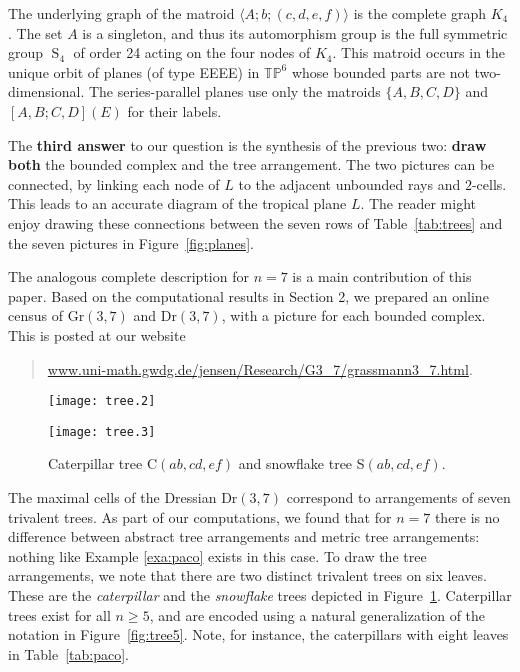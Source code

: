\documentclass[12pt,a4paper]{amsart}
\theoremstyle{definition}
\newcommand{\Gr}{{\mathrm{Gr}}}
\newcommand{\Dr}{{\mathrm{Dr}}}
\newcommand{\TP}{{\mathbb{TP}}}
\providecommand{\Sym}{\operatorname{S}}
\begin{document}
The underlying graph of the matroid $\langle A;b;(c,d,e,f)\rangle$ is
the complete graph $K_4$.  The set $A$ is a singleton, and thus its
automorphism group is the full symmetric group $\Sym_4$ of order 24
acting on the four nodes of $K_4$.  This matroid occurs in the unique
orbit of planes (of type EEEE) in $\TP^6$ whose bounded parts are not
two-dimensional. The series-parallel planes use only the matroids
$\{A,B,C,D\}$ and   $[A,B;C,D](E)$ for their labels.

The \textbf{third answer} to our question is the synthesis of the
previous two: \textbf{draw both} the bounded complex and the tree
arrangement.  The two pictures can be connected, by linking each node
of $L$ to the adjacent unbounded rays and $2$-cells. This leads to an
accurate diagram of the tropical plane $L$. The reader might enjoy
drawing these connections between the seven rows of
Table~\ref{tab:trees} and the seven pictures in
Figure~\ref{fig:planes}.

The analogous complete description for $n=7$ is a main contribution of
this paper. Based on the computational results in Section 2, we
prepared an online census of $\Gr(3,7)$ and $\Dr(3,7)$, with a picture
for each bounded complex. This is posted at our website
\begin{quote}\small
  \url{www.uni-math.gwdg.de/jensen/Research/G3_7/grassmann3_7.html}.
\end{quote}

\begin{figure}[htb]\centering
  \begin{minipage}[c]{.45\textwidth}\centering
    \texttt{[image: tree.2]}
  \end{minipage}
  \begin{minipage}[c]{.45\textwidth}\centering
    \texttt{[image: tree.3]}
  \end{minipage}
  \caption{Caterpillar tree C$(ab,cd,ef)$ and snowflake tree S$(ab,cd,ef)$.}
  \label{fig:trees6}
\end{figure}

The maximal cells of the Dressian $\Dr(3,7)$ correspond to
arrangements of seven trivalent trees. As part of our computations, we
found that for $n=7$ there is no difference between abstract tree
arrangements and metric tree arrangements: nothing like Example
\ref{exa:paco} exists in this case.  To draw the tree arrangements, we
note that there are two distinct trivalent trees on six leaves.  These
are the \emph{caterpillar} and the \emph{snowflake} trees depicted in
Figure~\ref{fig:trees6}.  Caterpillar trees exist for all $n\ge 5$,
and are encoded using a natural generalization of the notation in
Figure~\ref{fig:tree5}.  Note, for instance, the caterpillars with
eight leaves in Table~\ref{tab:paco}.
\end{document}
